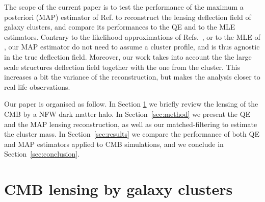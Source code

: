 \documentclass[prd, superscriptaddress, tightenlines, longbibliography, nofootinbib, eqsecnum, amsfonts, amsmath, floatfix, twocolumn, notitlepage]{revtex4-2}
\newcommand{\JC}[1]{\color{purple}{{JC:#1}}\color{black}\xspace}
\newcommand{\LL}[1]{{\color{orange}{LL: #1}}}
\begin{document}


The scope of the current paper is to test the performance of the maximum a posteriori (MAP) estimator of Ref. \cite{Carron:2017mqf} to reconstruct the lensing deflection field of galaxy clusters, and compare its performances to the QE and to the MLE estimators. 
Contrary to the likelihood approximations of Refs.~\cite{ Yoo:2008bf, Yoo:2010jd}, or to the MLE of \cite{Lewis:2005fq, Baxter:2014frs, Raghunathan:2017cle}, our MAP estimator do not need to assume a cluster profile, and is thus agnostic in the true deflection field. Moreover,  our work takes into account the the large scale structures deflection field together with the one from the cluster. This increases a bit the variance of the reconstruction, but makes the analysis closer to real life observations. 



Our paper is organised as follow. In Section \ref{sec:model} we briefly review the lensing of the CMB by a NFW dark matter halo. In Section~\ref{sec:method} we present the QE and the MAP lensing reconstruction, as well as our matched-filtering to estimate the cluster mass. In Section~\ref{sec:results} we compare the performance of both QE and MAP estimators applied to CMB simulations, and we conclude in Section~\ref{sec:conclusion}.


\section{CMB lensing by galaxy clusters}
\label{sec:model}
\end{document}
